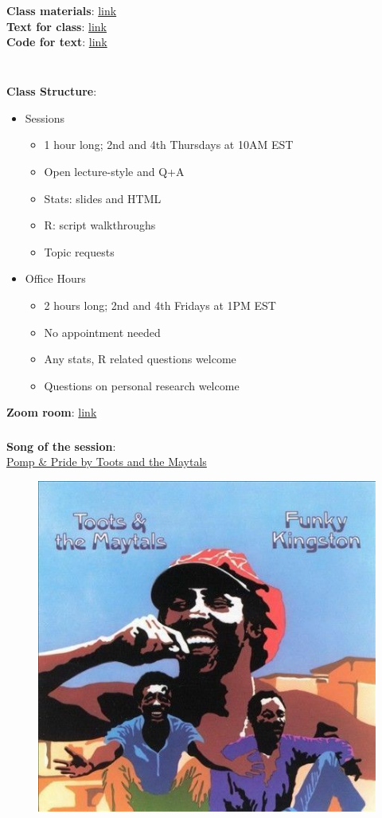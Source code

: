 \documentclass[xcolor=dvipsnames]{beamer}
\begin{document}
\begin{frame}
\frametitle{\insertsectionhead}
\textbf{Class materials}: \href{https://kmdono02.github.io/teaching/}{link}\\
\textbf{Text for class}: \href{https://kmdono02.github.io/Data_Analysis_with_R_IBIS/}{link}\\
\textbf{Code for text}: \href{https://github.com/kmdono02/Data_Analysis_with_R_IBIS}{link}\\~\\
\end{frame}

\begin{frame}
\frametitle{\insertsectionhead}
\textbf{Class Structure}:
\begin{itemize}
\item Sessions
\begin{itemize}
\item 1 hour long; 2nd and 4th Thursdays at 10AM EST
\item Open lecture-style and Q+A
\item Stats: slides and HTML
\item R: script walkthroughs
\item Topic requests
\end{itemize}
\item Office Hours
\begin{itemize}
\item 2 hours long; 2nd and 4th Fridays at 1PM EST
\item No appointment needed
\item Any stats, R related questions welcome
\item Questions on personal research welcome
\end{itemize}
\end{itemize}
\textbf{Zoom room}: \href{https://uncsph.zoom.us/j/8587296876}{link}
\end{frame}

\begin{frame}
\frametitle{\insertsectionhead}
\textbf{Song of the session}:\\
\href{https://www.youtube.com/watch?v=FB-DgI7wM1Y}{Pomp \& Pride by Toots and the Maytals}
\begin{figure}
\includegraphics[scale=0.5]{images/funky_kingston.jpg}
\end{figure}
\end{frame}
\end{document}
